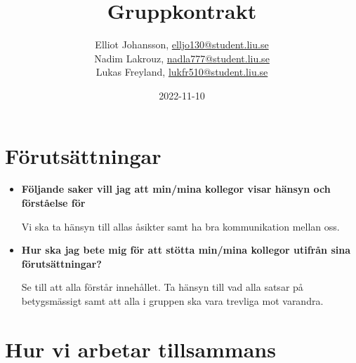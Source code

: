 \documentclass{mall}
\author{Elliot Johansson, \url{elljo130@student.liu.se}\\
  Nadim Lakrouz, \url{nadla777@student.liu.se}\\
  Lukas Freyland, \url{lukfr510@student.liu.se}}
\title{Gruppkontrakt}
\date{2022-11-10}
\begin{document}
\projectpage

\section{Förutsättningar}
\label{prereq}



\begin{itemize}
\item \textbf{Följande saker vill jag att min/mina kollegor visar hänsyn och förståelse för}

Vi ska ta hänsyn till allas åsikter samt ha bra kommunikation mellan oss. 

\item \textbf{Hur ska jag bete mig för att stötta min/mina kollegor utifrån sina förutsättningar?}

Se till att alla förstår innehållet. Ta hänsyn till vad alla satsar på betygsmässigt samt att alla i gruppen ska vara trevliga mot varandra.   

\end{itemize}

\section{Hur vi arbetar tillsammans}
\end{document}
